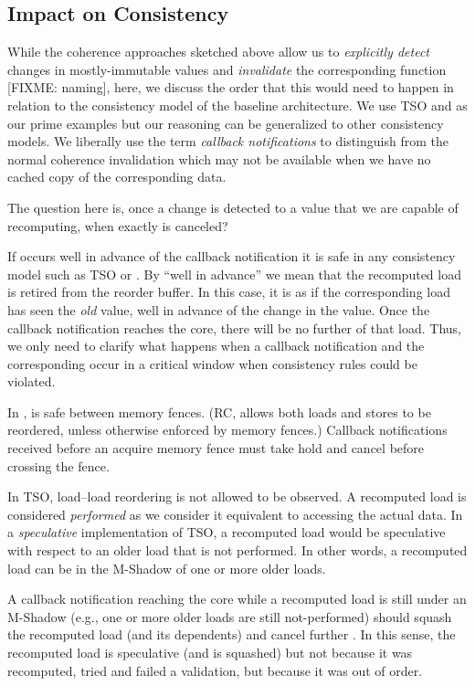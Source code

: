 \subsection{Impact on Consistency}
\label{sec:consistency}
While the coherence approaches sketched above allow us to \emph{explicitly detect} changes in mostly-immutable values and \emph{invalidate} the corresponding {\recomp} function {\color{red} [FIXME: naming]}, here, we discuss the order that this would need to happen in relation to the consistency model of the baseline architecture.
We use TSO and {\rc} as our prime examples but our reasoning can be generalized to other consistency models. We liberally use the term \emph{callback notifications} to distinguish from the normal coherence invalidation which may not be available when we have no cached copy of the corresponding data.

The question here is, once a change is detected to a value that we are capable of recomputing, when exactly is {\recomp} canceled? 

If {\recomp} occurs well in advance of the callback notification it is safe in any consistency model such as TSO or {\rc}. By ``well in advance'' we mean that the recomputed load is retired from the reorder buffer. In this case, it is as if the corresponding load has seen the \emph{old} value, well in advance of the change in the value. Once the callback notification reaches the core, there will be no further {\recomp} of that load.
Thus, we only need to clarify what happens when a callback notification and the corresponding {\recomp} occur in a critical window when consistency rules could be violated.

In {\rc}, {\recomp} is safe between memory fences. (RC, allows both loads and stores to be reordered, unless otherwise enforced by memory fences.) Callback notifications received before an acquire memory fence must take hold and cancel {\recomp} before crossing the fence.

In TSO, load--load reordering is not allowed to be observed. A recomputed load is considered \emph{performed} as we consider it equivalent to accessing the actual data. In a \emph{speculative} implementation of TSO,  a recomputed load would be speculative with respect to an older load that is not performed. In other words, a recomputed load can be  in the M-Shadow of one or more older loads.

A callback notification reaching the core while a recomputed load is still under an M-Shadow (e.g., one or more older loads are still not-performed) should squash the recomputed load (and its dependents) and cancel further {\recomp}. In this sense, the recomputed load is speculative (and is squashed) but not because it was recomputed, tried and failed a validation, but because it was out of order. 

